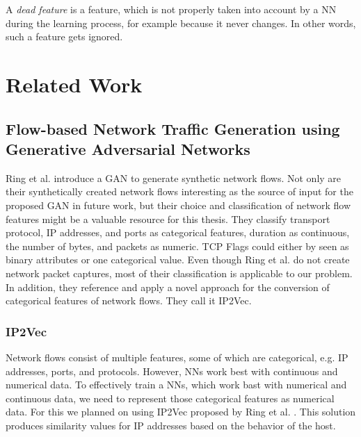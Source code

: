 \documentclass[
	ngerman,
	ruledheaders=section,%
	class=report,%
	thesis={type=bachelor},%
	accentcolor=9c,%
	custommargins=true,%
	marginpar=false,%
	parskip=half-,%
	fontsize=11pt,%
	twoside
]{tudapub}
\begin{document}
A \textit{dead feature} is a feature, which is not properly taken into account by a NN during the learning process, for example because it never changes. In other words, such a feature gets ignored.

\chapter{Related Work}
\label{sec:relatedWork}


\section{Flow-based Network Traffic Generation using Generative Adversarial Networks}
\label{sec:ringGAN}

Ring et al. \cite{ringFlowbasedNetworkTraffic2019a} introduce a GAN to generate synthetic network flows.
Not only are their synthetically created network flows interesting as the source of input for the proposed GAN in future work,
but their choice and classification of network flow features might be a valuable resource for this thesis.
They classify transport protocol, IP addresses, and ports as categorical features, duration as continuous, the number of bytes, and packets as numeric.
TCP Flags could either by seen as binary attributes or one categorical value.
Even though Ring et al. \cite{ringFlowbasedNetworkTraffic2019a} do not create network packet captures, most of their classification is applicable to our problem.
In addition, they reference and apply a novel approach for the conversion of categorical features of network flows.
They call it IP2Vec.

\subsection{IP2Vec}
\label{sec:IP2Vec}

Network flows consist of multiple features, some of which are categorical, e.g. IP addresses, ports, and protocols.
However, NNs work best with continuous and numerical data.
To effectively train a NNs, which work bast with numerical and continuous data, we need to represent those categorical features as numerical data.
For this we planned on using IP2Vec proposed by Ring et al. \cite{ringIP2VecLearningSimilarities2017}.
This solution produces similarity values for IP addresses based on the behavior of the host.
\end{document}
